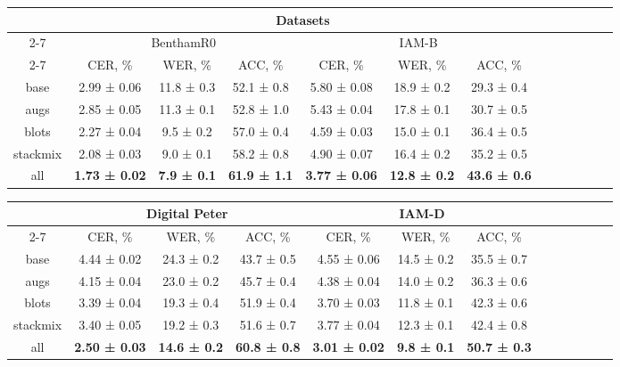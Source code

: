 \documentclass[10pt,twocolumn,letterpaper]{article}
\begin{document}
 
\begin{table*}[ht]
\begin{center}
\begin{tabular}{|c|c|c|c|c|c|c|c|c|c|c|c|c|}
\hline
\multirow{3}{*}{ } 
& \multicolumn{6}{c|}{Datasets} \\
\cline{2-7}
& \multicolumn{3}{c|}{BenthamR0} &  \multicolumn{3}{c|}{IAM-B} \\
\cline{2-7}
& CER, \% & WER, \% & ACC, \% & CER, \% & WER, \% & ACC, \% \\
\hline
base & 2.99 ± 0.06 & 11.8 ± 0.3 & 52.1 ± 0.8 & 5.80 ± 0.08 & 18.9 ± 0.2 & 29.3 ± 0.4  \\
augs & 2.85 ± 0.05 & 11.3 ± 0.1 & 52.8 ± 1.0 & 5.43 ± 0.04 & 17.8 ± 0.1 & 30.7 ± 0.5  \\
blots & 2.27 ± 0.04 & 9.5 ± 0.2 & 57.0 ± 0.4 & 4.59 ± 0.03 & 15.0 ± 0.1 & 36.4 ± 0.5  \\
stackmix & 2.08 ± 0.03 & 9.0 ± 0.1 & 58.2 ± 0.8 & 4.90 ± 0.07 & 16.4 ± 0.2 & 35.2 ± 0.5 \\
all & \textbf{1.73 ± 0.02} & \textbf{7.9 ± 0.1} & \textbf{61.9 ± 1.1} & \textbf{3.77 ± 0.06} & \textbf{12.8 ± 0.2} & \textbf{43.6 ± 0.6} \\
\hline
\end{tabular}





\begin{tabular}{|c|c|c|c|c|c|c|c|c|c|c|c|c|}
\hline
\hline
\multirow{3}{*}{ } 
& \multicolumn{3}{c|}{Digital Peter} &  \multicolumn{3}{c|}{IAM-D} \\
\cline{2-7}
& CER, \% & WER, \% & ACC, \% & CER, \% & WER, \% & ACC, \% \\
\hline
base & 4.44 ± 0.02 & 24.3 ± 0.2 & 43.7 ± 0.5 & 4.55 ± 0.06 & 14.5 ± 0.2 & 35.5 ± 0.7 \\
augs & 4.15 ± 0.04 & 23.0 ± 0.2 & 45.7 ± 0.4 & 4.38 ± 0.04 & 14.0 ± 0.2 & 36.3 ± 0.6  \\
blots & 3.39 ± 0.04 & 19.3 ± 0.4 & 51.9 ± 0.4 & 3.70 ± 0.03 & 11.8 ± 0.1 & 42.3 ± 0.6  \\
stackmix & 3.40 ± 0.05 & 19.2 ± 0.3 & 51.6 ± 0.7 & 3.77 ± 0.04 & 12.3 ± 0.1 & 42.4 ± 0.8 \\
all & \textbf{2.50 ± 0.03} & \textbf{14.6 ± 0.2} & \textbf{60.8 ± 0.8} & \textbf{3.01 ± 0.02} & \textbf{9.8 ± 0.1} & \textbf{50.7 ± 0.3}  \\
\hline
\end{tabular}




\end{center}
\end{table*}
\end{document}
